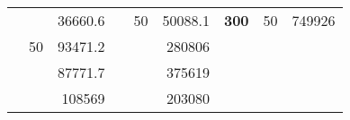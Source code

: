 \begin{table}[]
\begin{tabular}{|ccrccrccc}
\rowcolor[HTML]{DDFDFF} 
\multicolumn{1}{|c|}{\cellcolor[HTML]{FFFFC7}}                                & \multicolumn{1}{c|}{\cellcolor[HTML]{DDFDFF}}                      & \multicolumn{1}{r|}{\cellcolor[HTML]{DAE8FC}36660.6}   & \multicolumn{1}{c|}{\cellcolor[HTML]{FFFFC7}}                                & \multicolumn{1}{c|}{\multirow{-10}{*}{\cellcolor[HTML]{DDFDFF}50}}  & \multicolumn{1}{r|}{\cellcolor[HTML]{DDFDFF}50088.1}   & \multicolumn{1}{c|}{\multirow{-19}{*}{\cellcolor[HTML]{FFFFC7}\textbf{300}}} & \multicolumn{1}{c|}{\multirow{-10}{*}{\cellcolor[HTML]{DDFDFF}50}} & \multicolumn{1}{r|}{\cellcolor[HTML]{DDFDFF}749926}    \\ \cline{3-3} \cline{5-9} 
\multicolumn{1}{|c|}{\cellcolor[HTML]{FFFFC7}}                                & \multicolumn{1}{c|}{\multirow{-10}{*}{\cellcolor[HTML]{DDFDFF}50}} & \multicolumn{1}{r|}{\cellcolor[HTML]{DDFDFF}93471.2}   & \multicolumn{1}{c|}{\cellcolor[HTML]{FFFFC7}}                                & \multicolumn{1}{c|}{\cellcolor[HTML]{DAE8FC}}                       & \multicolumn{1}{r|}{\cellcolor[HTML]{DAE8FC}280806}    &                                                                              &                                                                    &                                                        \\ \cline{2-3} \cline{6-6}
\multicolumn{1}{|c|}{\cellcolor[HTML]{FFFFC7}}                                & \multicolumn{1}{c|}{\cellcolor[HTML]{DAE8FC}}                      & \multicolumn{1}{r|}{\cellcolor[HTML]{DAE8FC}87771.7}   & \multicolumn{1}{c|}{\cellcolor[HTML]{FFFFC7}}                                & \multicolumn{1}{c|}{\cellcolor[HTML]{DAE8FC}}                       & \multicolumn{1}{r|}{\cellcolor[HTML]{DDFDFF}375619}    &                                                                              &                                                                    &                                                        \\ \cline{3-3} \cline{6-6}
\multicolumn{1}{|c|}{\cellcolor[HTML]{FFFFC7}}                                & \multicolumn{1}{c|}{\cellcolor[HTML]{DAE8FC}}                      & \multicolumn{1}{r|}{\cellcolor[HTML]{DDFDFF}108569}    & \multicolumn{1}{c|}{\cellcolor[HTML]{FFFFC7}}                                & \multicolumn{1}{c|}{\cellcolor[HTML]{DAE8FC}}                       & \multicolumn{1}{r|}{\cellcolor[HTML]{DAE8FC}203080}    &                                                                              &                                                                    &                                                        \\ \cline{3-3} \cline{6-6}

\end{tabular}
\end{table}
